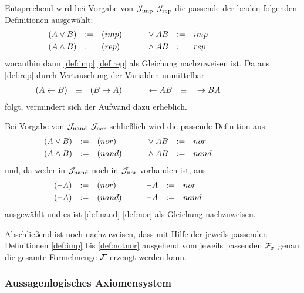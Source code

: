 Entsprechend wird bei Vorgabe von $\mathcal{J}_{\mathrm{imp}}$ \textbzw $\mathcal{J}_{\mathrm{rep}}$ die passende der beiden folgenden Definitionen ausgewählt:
\begin{align}
&              (A \lor  B)  & := & & & (imp)
& &&&& & \lor  A B & := & & &  imp
\label{def:orrep}
\\
&              (A \land B)  & := & & & (rep)
& &&&& & \land A B & := & & &  rep
\label{def:andrep}
&&&&&&&&&&
\end{align}
woraufhin dann \ref{def:imp} \textbzw \ref{def:rep} als Gleichung nachzuweisen ist.
Da aus \ref{def:rep} durch Vertauschung der Variablen unmittelbar
\begin{align}
&              (A \leftarrow B)  & \equiv & & & (B \rightarrow A)
& &&&& & \leftarrow A B & \equiv & & &    \rightarrow B A
\label{eq:repimp}
&&&&&&&&&&
\end{align}
folgt, vermindert sich der Aufwand dazu erheblich.

Bei Vorgabe von $\mathcal{J}_{\mathrm{nand}}$ \textbzw $\mathcal{J}_{\mathrm{nor}}$ schließlich
wird die passende Definition aus
\begin{align}
&              (A \lor  B)  & := & & & (nor)
& &&&& & \lor  A B & := & & &  nor
\label{def:ornor}
\\
&              (A \land B)  & := & & & (nand)
& &&&& & \land A B & := & & &  nand
\label{def:andnand}
&&&&&&&&&&
\end{align}
und, da \symqt{$\lnot$} weder in $\mathcal{J}_{\mathrm{nand}}$ noch in $\mathcal{J}_{\mathrm{nor}}$ vorhanden ist, aus
\begin{align}
&                (\lnot A) & := & & & (nor)
& &&&& & \lnot A  & := & & &  nor
\label{def:notnor}
\\
&                (\lnot A) & := & & & (nand)
& &&&& & \lnot A  & := & & &  nand
\label{def:notnand}
&&&&&&&&&&
\end{align}
ausgewählt und es ist \ref{def:nand} \textbzw \ref{def:nor} als Gleichung nachzuweisen.

Abschließend ist noch nachzuweisen, dass mit Hilfe der jeweils passenden Definitionen \ref{def:imp} bis \ref{def:notnor} ausgehend vom jeweils passenden $\mathcal{F}_x$ genau die gesamte Formelmenge $\mathcal{F}$ erzeugt werden kann.

\subsubsection{Aussagenlogisches Axiomensystem}%
\label{subsub:ausAxiome}

